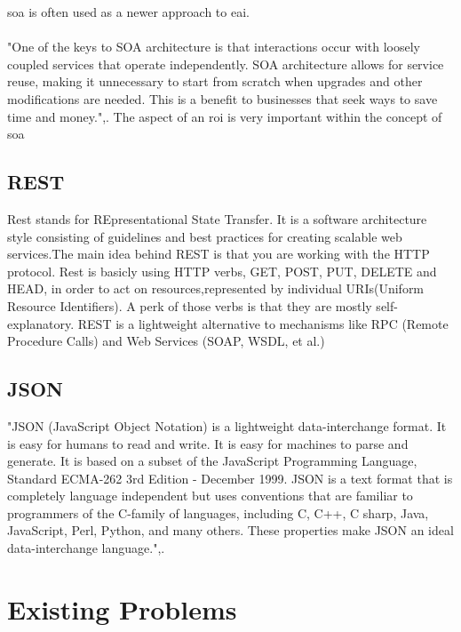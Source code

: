 \documentclass[12pt]{article}
\begin{document}
\gls{soa} is often used as a newer approach to \gls{eai}. \cite{soaitwissen}
\\ \\
"One of the keys to SOA architecture is that interactions occur with loosely coupled services that operate independently. SOA architecture allows for service reuse, making it unnecessary to start from scratch when upgrades and other modifications are needed. This is a benefit to businesses that seek ways to save time and money.",\cite{searchsoa}. The aspect of an \gls{roi} is very important within the concept of \gls{soa}
\subsection{REST}
Rest stands for REpresentational State Transfer. It is a software architecture style consisting of guidelines and best practices 
for creating scalable web services.The main idea behind REST is that you are working with the HTTP protocol. Rest is basicly using HTTP verbs, GET, POST, PUT, DELETE and HEAD, in order to act on resources,represented by individual URIs(Uniform Resource Identifiers). 
A perk of those verbs is that they are mostly self-explanatory. REST is a lightweight alternative to mechanisms like RPC (Remote Procedure Calls) and Web Services (SOAP, WSDL, et al.)
\subsection{JSON}
"JSON (JavaScript Object Notation) is a lightweight data-interchange format. It is easy for humans to read and write. It is easy for machines to parse and generate. It is based on a subset of the JavaScript Programming Language, Standard ECMA-262 3rd Edition - December 1999. JSON is a text format that is completely language independent but uses conventions that are familiar to programmers of the C-family of languages, including C, C++, C sharp, Java, JavaScript, Perl, Python, and many others. These properties make JSON an ideal data-interchange language.",\cite{json}.

\section{Existing Problems}
\end{document}
